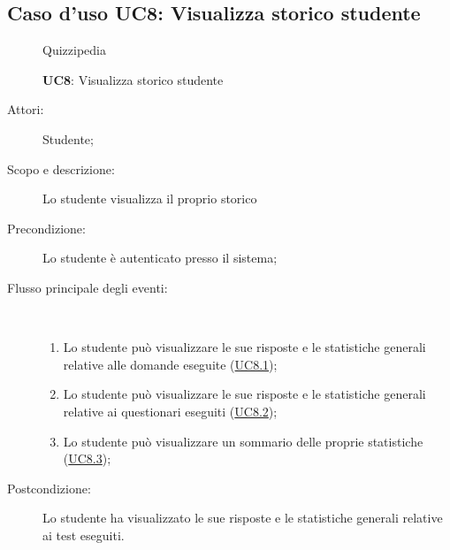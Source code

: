 \subsection{Caso d'uso UC8: Visualizza storico studente}
	\begin{figure}[H]
		\centering
		\begin{resizedtikzpicture}{\textwidth}
		\begin{umlsystem}[x=0, fill=lightgray!20]{Quizzipedia}
		\end{umlsystem}
		\end{resizedtikzpicture}
		\caption{\textbf{UC8}: Visualizza storico studente}
		\label{UC8}
	\end{figure}
\begin{description}
\item[Attori:] Studente;
\item[Scopo e descrizione:] Lo studente visualizza il proprio storico
      \item[Precondizione:] Lo studente è autenticato presso il sistema;

        \item[Flusso principale degli eventi:] \ 
 \begin{enumerate}
          \item Lo studente può visualizzare le sue risposte e le statistiche generali relative alle domande eseguite (\hyperlink{UC8.1}{UC8.1});
          \item Lo studente può visualizzare le sue risposte e le statistiche generali relative ai questionari eseguiti (\hyperlink{UC8.2}{UC8.2});
          \item Lo studente può visualizzare un sommario delle proprie statistiche (\hyperlink{UC8.3}{UC8.3});

      \end{enumerate}
    \item[Postcondizione:] Lo studente ha visualizzato le sue risposte e le statistiche generali relative ai test eseguiti.
  \end{description}
\hypertarget{UC8.1}{}

